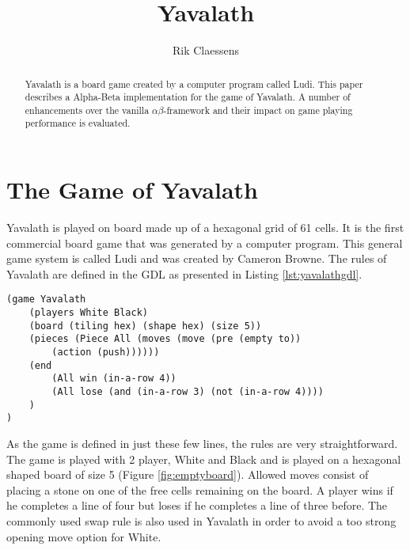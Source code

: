 \documentclass[11pt]{article}
\begin{document}
\title{{\Huge Yavalath} \\ \vspace{0.5em}{\large August 2014 - Intelligent Search \& Games\\ Master Artificial Intelligence, Maastricht University}}	
\author{Rik Claessens}

\maketitle

\begin{abstract}
Yavalath is a board game created by a computer program called Ludi. This paper describes a Alpha-Beta implementation for the game of Yavalath. A number of enhancements over the vanilla $\alpha \beta$-framework and their impact on game playing performance is evaluated.
\end{abstract}

\section{The Game of Yavalath}
\label{-sec:thegameofyavalath}
Yavalath is played on board made up of a hexagonal grid of 61 cells. It is the first commercial board game that was generated by a computer program. This general game system is called Ludi and was created by Cameron Browne. The rules of Yavalath are defined in the \ac{GDL} as presented in Listing \ref{lst:yavalathgdl}. 

\listingspace
\begin{lstlisting}[caption={The Yavalath definition in GDL}]
(game Yavalath
	(players White Black)
	(board (tiling hex) (shape hex) (size 5))
	(pieces (Piece All (moves (move (pre (empty to))
		(action (push)))))) 
	(end
		(All win (in-a-row 4))
		(All lose (and (in-a-row 3) (not (in-a-row 4))))
	)
)
\end{lstlisting}
\label{lst:yavalathgdl}
\listingspace

As the game is defined in just these few lines, the rules are very straightforward. The game is played with 2 player, White and Black and is played on a hexagonal shaped board of size 5 (Figure \ref{fig:emptyboard}). Allowed moves consist of placing a stone on one of the free cells remaining on the board. A player wins if he completes a line of four but loses if he completes a line of three before. The commonly used swap rule is also used in Yavalath in order to avoid a too strong opening move option for White. 
\end{document}

